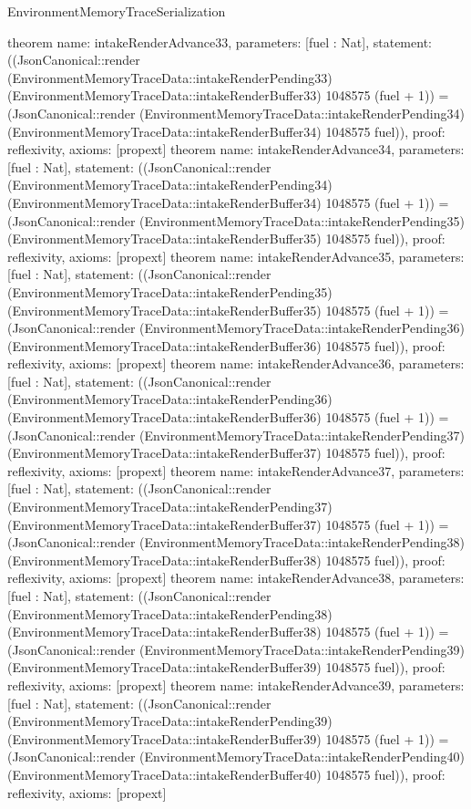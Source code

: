 \begin{lexlean}{EnvironmentMemoryTraceSerialization}
\begin{semanticmodule}
{}
theorem{
 name: intakeRenderAdvance33, parameters: [fuel : Nat],
 statement: ((JsonCanonical::render (EnvironmentMemoryTraceData::intakeRenderPending33) (EnvironmentMemoryTraceData::intakeRenderBuffer33) 1048575 (fuel + 1)) = (JsonCanonical::render (EnvironmentMemoryTraceData::intakeRenderPending34) (EnvironmentMemoryTraceData::intakeRenderBuffer34) 1048575 fuel)), proof: reflexivity{}, axioms: [propext]
}
theorem{
 name: intakeRenderAdvance34, parameters: [fuel : Nat],
 statement: ((JsonCanonical::render (EnvironmentMemoryTraceData::intakeRenderPending34) (EnvironmentMemoryTraceData::intakeRenderBuffer34) 1048575 (fuel + 1)) = (JsonCanonical::render (EnvironmentMemoryTraceData::intakeRenderPending35) (EnvironmentMemoryTraceData::intakeRenderBuffer35) 1048575 fuel)), proof: reflexivity{}, axioms: [propext]
}
theorem{
 name: intakeRenderAdvance35, parameters: [fuel : Nat],
 statement: ((JsonCanonical::render (EnvironmentMemoryTraceData::intakeRenderPending35) (EnvironmentMemoryTraceData::intakeRenderBuffer35) 1048575 (fuel + 1)) = (JsonCanonical::render (EnvironmentMemoryTraceData::intakeRenderPending36) (EnvironmentMemoryTraceData::intakeRenderBuffer36) 1048575 fuel)), proof: reflexivity{}, axioms: [propext]
}
theorem{
 name: intakeRenderAdvance36, parameters: [fuel : Nat],
 statement: ((JsonCanonical::render (EnvironmentMemoryTraceData::intakeRenderPending36) (EnvironmentMemoryTraceData::intakeRenderBuffer36) 1048575 (fuel + 1)) = (JsonCanonical::render (EnvironmentMemoryTraceData::intakeRenderPending37) (EnvironmentMemoryTraceData::intakeRenderBuffer37) 1048575 fuel)), proof: reflexivity{}, axioms: [propext]
}
theorem{
 name: intakeRenderAdvance37, parameters: [fuel : Nat],
 statement: ((JsonCanonical::render (EnvironmentMemoryTraceData::intakeRenderPending37) (EnvironmentMemoryTraceData::intakeRenderBuffer37) 1048575 (fuel + 1)) = (JsonCanonical::render (EnvironmentMemoryTraceData::intakeRenderPending38) (EnvironmentMemoryTraceData::intakeRenderBuffer38) 1048575 fuel)), proof: reflexivity{}, axioms: [propext]
}
theorem{
 name: intakeRenderAdvance38, parameters: [fuel : Nat],
 statement: ((JsonCanonical::render (EnvironmentMemoryTraceData::intakeRenderPending38) (EnvironmentMemoryTraceData::intakeRenderBuffer38) 1048575 (fuel + 1)) = (JsonCanonical::render (EnvironmentMemoryTraceData::intakeRenderPending39) (EnvironmentMemoryTraceData::intakeRenderBuffer39) 1048575 fuel)), proof: reflexivity{}, axioms: [propext]
}
theorem{
 name: intakeRenderAdvance39, parameters: [fuel : Nat],
 statement: ((JsonCanonical::render (EnvironmentMemoryTraceData::intakeRenderPending39) (EnvironmentMemoryTraceData::intakeRenderBuffer39) 1048575 (fuel + 1)) = (JsonCanonical::render (EnvironmentMemoryTraceData::intakeRenderPending40) (EnvironmentMemoryTraceData::intakeRenderBuffer40) 1048575 fuel)), proof: reflexivity{}, axioms: [propext]
}
\end{semanticmodule}
\end{lexlean}
